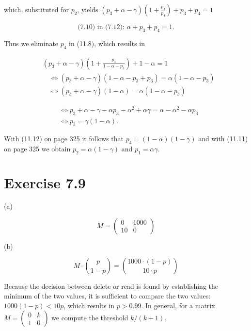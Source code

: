 \documentclass[10pt]{book}
\begin{document}
which, substituted for $p_{2}$, yields $\left(p_{3}+\alpha-\gamma\right)\left(1+\frac{p_{3}}{p_{4}}\right)+p_{3}+p_{4}=1$


\begin{equation*}
\text { (7.10) in (7.12): } \alpha+p_{3}+p_{4}=1 \text {. } \tag{11.12}
\end{equation*}


Thus we eliminate $p_{4}$ in (11.8), which results in


\begin{align*}
& \left(p_{3}+\alpha-\gamma\right)\left(1+\frac{p_{3}}{1-\alpha-p_{3}}\right)+1-\alpha=1  \tag{11.13}\\
& \quad \Leftrightarrow\left(p_{3}+\alpha-\gamma\right)\left(1-\alpha-p_{3}+p_{3}\right)=\alpha\left(1-\alpha-p_{3}\right)  \tag{11.14}\\
& \quad \Leftrightarrow\left(p_{3}+\alpha-\gamma\right)(1-\alpha)=\alpha\left(1-\alpha-p_{3}\right) \tag{11.15}
\end{align*}



\begin{align*}
& \Leftrightarrow p_{3}+\alpha-\gamma-\alpha p_{3}-\alpha^{2}+\alpha \gamma=\alpha-\alpha^{2}-\alpha p_{3}  \tag{11.16}\\
& \Leftrightarrow p_{3}=\gamma(1-\alpha) . \tag{11.17}
\end{align*}


With (11.12) on page 325 it follows that $p_{4}=(1-\alpha)(1-\gamma)$ and with (11.11) on page 325 we obtain $p_{2}=\alpha(1-\gamma)$ and $p_{1}=\alpha \gamma$.

\section*{Exercise 7.9}
(a)

$$
M=\left(\begin{array}{cc}
0 & 1000 \\
10 & 0
\end{array}\right)
$$

(b)

$$
M \cdot\binom{p}{1-p}=\binom{1000 \cdot(1-p)}{10 \cdot p}
$$

Because the decision between delete or read is found by establishing the minimum of the two values, it is sufficient to compare the two values: $1000(1-p)<10 p$, which results in $p>0.99$. In general, for a matrix $M=\left(\begin{array}{ll}0 & k \\ 1 & 0\end{array}\right)$ we compute the threshold $k /(k+1)$.
\end{document}
